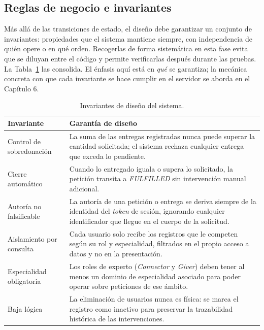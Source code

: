 \documentclass[11pt,oneside,spanish,listoffigures,listoftables]{tfgetsinf}
\begin{document}
\subsection{Reglas de negocio e invariantes}

Más allá de las transiciones de estado, el diseño debe garantizar un conjunto de invariantes: propiedades que el sistema mantiene siempre, con independencia de quién opere o en qué orden. Recogerlas de forma sistemática en esta fase evita que se diluyan entre el código y permite verificarlas después durante las pruebas. La Tabla~\ref{tab:invariantes} las consolida. El énfasis aquí está en \textit{qué} se garantiza; la mecánica concreta con que cada invariante se hace cumplir en el servidor se aborda en el Capítulo 6.

\begin{table}[ht]
\centering
\caption[Invariantes de diseño del sistema]{Invariantes de diseño del sistema.}
\label{tab:invariantes}
\footnotesize
\renewcommand{\arraystretch}{1.3}
\begin{tabularx}{\textwidth}{%
  >{\raggedright\arraybackslash}p{2.4cm}%
  >{\raggedright\arraybackslash}X}
\toprule
\textbf{Invariante} & \textbf{Garantía de diseño} \\
\midrule
Control de sobredonación & La suma de las entregas registradas nunca puede superar la cantidad solicitada; el sistema rechaza cualquier entrega que exceda lo pendiente. \\
Cierre automático & Cuando lo entregado iguala o supera lo solicitado, la petición transita a \textit{FULFILLED} sin intervención manual adicional. \\
Autoría no falsificable & La autoría de una petición o entrega se deriva siempre de la identidad del \textit{token} de sesión, ignorando cualquier identificador que llegue en el cuerpo de la solicitud. \\
Aislamiento por consulta & Cada usuario solo recibe los registros que le competen según su rol y especialidad, filtrados en el propio acceso a datos y no en la presentación. \\
Especialidad obligatoria & Los roles de experto (\textit{Connector} y \textit{Giver}) deben tener al menos un dominio de especialidad asociado para poder operar sobre peticiones de ese ámbito. \\
Baja lógica & La eliminación de usuarios nunca es física: se marca el registro como inactivo para preservar la trazabilidad histórica de las intervenciones. \\
\bottomrule
\end{tabularx}
\end{table}
\end{document}
